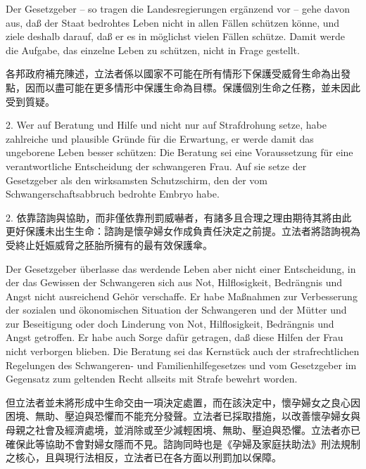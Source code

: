\documentclass[12pt]{article}
\begin{document}
\begin{sourcepara}[title={原文C.22}]
Der Gesetzgeber -- so tragen die Landesregierungen ergänzend vor -- gehe davon aus, daß der Staat bedrohtes Leben nicht in allen Fällen schützen könne, und ziele deshalb darauf, daß er es in möglichst vielen Fällen schütze. Damit werde die Aufgabe, das einzelne Leben zu schützen, nicht in Frage gestellt.
\end{sourcepara}
\begin{transpara}
各邦政府補充陳述，立法者係以國家不可能在所有情形下保護受威脅生命為出發點，因而以盡可能在更多情形中保護生命為目標。保護個別生命之任務，並未因此受到質疑。
\end{transpara}

\begin{sourcepara}[title={原文C.23}]
2. Wer auf Beratung und Hilfe und nicht nur auf Strafdrohung setze, habe zahlreiche und plausible Gründe für die Erwartung, er werde damit das ungeborene Leben besser schützen: Die Beratung sei eine Voraussetzung für eine verantwortliche Entscheidung der schwangeren Frau. Auf sie setze der Gesetzgeber als den wirksamsten Schutzschirm, den der vom Schwangerschaftsabbruch bedrohte Embryo habe.
\end{sourcepara}
\begin{transpara}
2. 依靠諮詢與協助，而非僅依靠刑罰威嚇者，有諸多且合理之理由期待其將由此更好保護未出生生命：諮詢是懷孕婦女作成負責任決定之前提。立法者將諮詢視為受終止妊娠威脅之胚胎所擁有的最有效保護傘。
\end{transpara}

\begin{sourcepara}[title={原文C.24}]
Der Gesetzgeber überlasse das werdende Leben aber nicht einer Entscheidung, in der das Gewissen der Schwangeren sich aus Not, Hilflosigkeit, Bedrängnis und Angst nicht ausreichend Gehör verschaffe. Er habe Maßnahmen zur Verbesserung der sozialen und ökonomischen Situation der Schwangeren und der Mütter und zur Beseitigung oder doch Linderung von Not, Hilflosigkeit, Bedrängnis und Angst getroffen. Er habe auch Sorge dafür getragen, daß diese Hilfen der Frau nicht verborgen blieben. Die Beratung sei das Kernstück auch der strafrechtlichen Regelungen des Schwangeren- und Familienhilfegesetzes und vom Gesetzgeber im Gegensatz zum geltenden Recht allseits mit Strafe bewehrt worden.
\end{sourcepara}
\begin{transpara}
但立法者並未將形成中生命交由一項決定處置，而在該決定中，懷孕婦女之良心因困境、無助、壓迫與恐懼而不能充分發聲。立法者已採取措施，以改善懷孕婦女與母親之社會及經濟處境，並消除或至少減輕困境、無助、壓迫與恐懼。立法者亦已確保此等協助不會對婦女隱而不見。諮詢同時也是《孕婦及家庭扶助法》刑法規制之核心，且與現行法相反，立法者已在各方面以刑罰加以保障。
\end{transpara}
\end{document}
